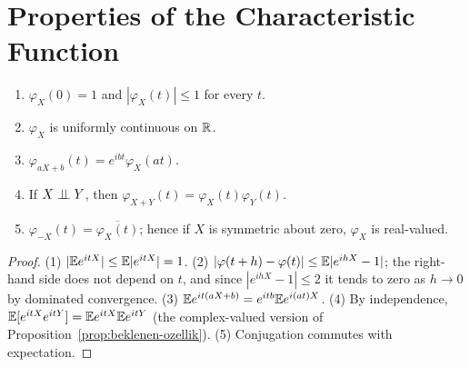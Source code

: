 \documentclass[main.tex]{subfiles}
\begin{document}
\section{Properties of the Characteristic Function}

\begin{proposition}\label{prop:kf-ozellik}
\begin{enumerate}
  \item $\varphi_X(0)=1$ and $|\varphi_X(t)|\le1$ for every $t$.
  \item $\varphi_X$ is uniformly continuous on $\mathbb{R}$.
  \item $\varphi_{aX+b}(t)=e^{ibt}\varphi_X(at)$.
  \item If $X\perp\!\!\!\perp Y$, then $\varphi_{X+Y}(t)=\varphi_X(t)\varphi_Y(t)$.
  \item $\varphi_{-X}(t)=\overline{\varphi_X(t)}$; hence if $X$ is symmetric about zero, $\varphi_X$ is real-valued.
\end{enumerate}
\end{proposition}
\begin{proof}
(1) $|\mathbb{E} e^{itX}|\le\mathbb{E}|e^{itX}|=1$. (2) $|\varphi(t+h)-\varphi(t)|\le\mathbb{E}|e^{ihX}-1|$; the right-hand side does not depend on $t$, and since $|e^{ihX}-1|\le2$ it tends to zero as $h\to0$ by dominated convergence. (3) $\mathbb{E} e^{it(aX+b)}=e^{itb}\mathbb{E} e^{i(at)X}$. (4) By independence, $\mathbb{E}[e^{itX}e^{itY}]=\mathbb{E} e^{itX}\mathbb{E} e^{itY}$ (the complex-valued version of Proposition~\ref{prop:beklenen-ozellik}). (5) Conjugation commutes with expectation.
\end{proof}
\end{document}

